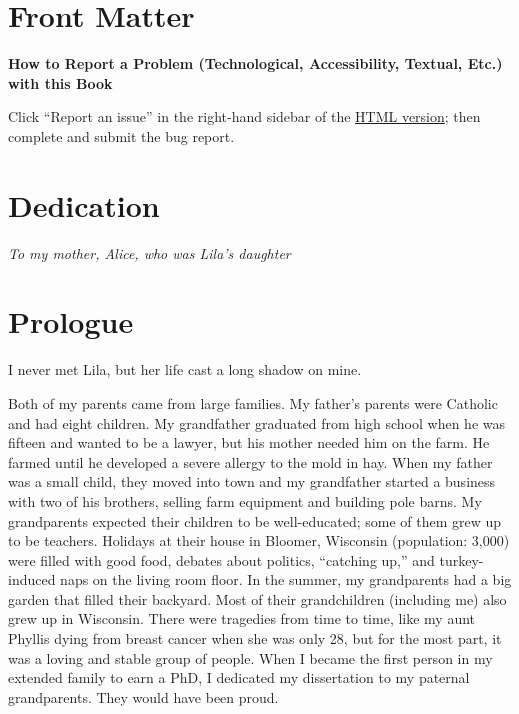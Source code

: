 \documentclass[
  letterpaper,
]{book}
\renewcommand*\contentsname{Table of contents}
\newcommand\contentsname{Table of contents}
\begin{document}

\renewcommand*\contentsname{Table of Contents}
{
\hypersetup{linkcolor=blue}
\setcounter{tocdepth}{2}
\tableofcontents
}
\listoffigures

\mainmatter
{}

\chapter{Front Matter}\label{front-matter}

\textbf{How to Report a Problem (Technological, Accessibility, Textual,
Etc.) with this Book}

Click ``Report an issue'' in the right-hand sidebar of the
\href{https://iulibscholcomm.github.io/afterthought/}{HTML version};
then complete and submit the bug report.


\chapter{Dedication}\label{dedication}

\emph{To my mother, Alice, who was Lila's daughter}


\chapter{Prologue}\label{prologue}

I never met Lila, but her life cast a long shadow on mine.

Both of my parents came from large families. My father's parents were
Catholic and had eight children. My grandfather graduated from high
school when he was fifteen and wanted to be a lawyer, but his mother
needed him on the farm. He farmed until he developed a severe allergy to
the mold in hay. When my father was a small child, they moved into town
and my grandfather started a business with two of his brothers, selling
farm equipment and building pole barns. My grandparents expected their
children to be well-educated; some of them grew up to be teachers.
Holidays at their house in Bloomer, Wisconsin (population: 3,000) were
filled with good food, debates about politics, ``catching up,'' and
turkey-induced naps on the living room floor. In the summer, my
grandparents had a big garden that filled their backyard. Most of their
grandchildren (including me) also grew up in Wisconsin. There were
tragedies from time to time, like my aunt Phyllis dying from breast
cancer when she was only 28, but for the most part, it was a loving and
stable group of people. When I became the first person in my extended
family to earn a PhD, I dedicated my dissertation to my paternal
grandparents. They would have been proud.
\end{document}
